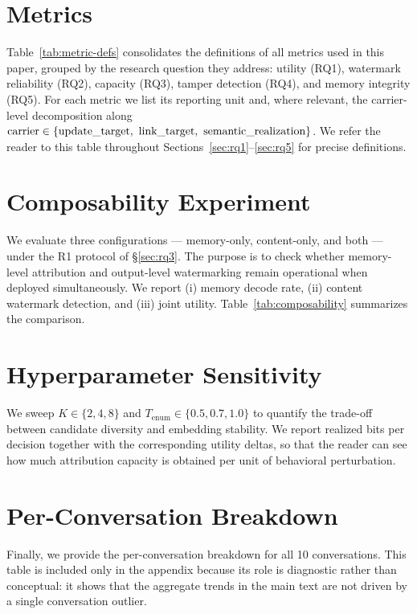 \section{Metrics}
\label{app:metrics}


Table~\ref{tab:metric-defs} consolidates the definitions of all metrics
used in this paper, grouped by the research question they address: utility
(RQ1), watermark reliability (RQ2), capacity (RQ3), tamper detection (RQ4),
and memory integrity (RQ5). For each metric we list its reporting unit and,
where relevant, the carrier-level decomposition along
$\mathrm{carrier} \in \{\text{update\_target},\ \text{link\_target},\
\text{semantic\_realization}\}$. We refer the reader to this table
throughout Sections~\ref{sec:rq1}--\ref{sec:rq5} for precise definitions.


\section{Composability Experiment}
\label{app:composability}
We evaluate three configurations --- memory-only, content-only, and
both --- under the R1 protocol of \S\ref{sec:rq3}. The purpose is to
check whether memory-level attribution and output-level watermarking
remain operational when deployed simultaneously. We report
(i) memory decode rate, (ii) content watermark detection, and
(iii) joint utility. Table~\ref{tab:composability} summarizes the
comparison.



\section{Hyperparameter Sensitivity}
\label{app:hyperparam}
We sweep $K \in \{2, 4, 8\}$ and
$T_{\text{enum}} \in \{0.5, 0.7, 1.0\}$ to quantify the trade-off
between candidate diversity and embedding stability. We report realized
bits per decision together with the corresponding utility deltas, so
that the reader can see how much attribution capacity is obtained per
unit of behavioral perturbation.



\section{Per-Conversation Breakdown}
\label{app:per-conv}
Finally, we provide the per-conversation breakdown for all
10 \locomo{} conversations. This table is included only in the
appendix because its role is diagnostic rather than conceptual: it
shows that the aggregate trends in the main text are not driven by a
single conversation outlier.


